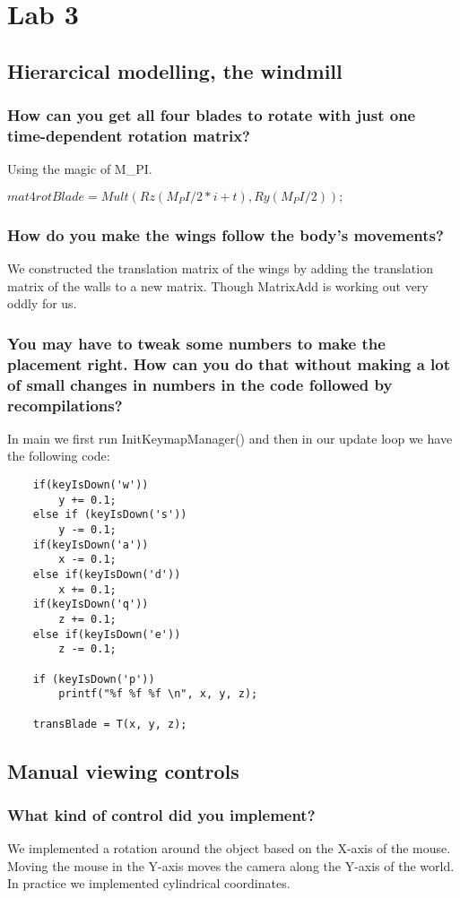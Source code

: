 \documentclass[a4paper,12pt]{article}
\begin{document}
\section{Lab 3}
\subsection{Hierarcical modelling, the windmill}
\subsubsection{How can you get all four blades to rotate with just one time-dependent rotation matrix?}
Using the magic of M\_PI.

$
		mat4 rotBlade = Mult(Rz(M_PI / 2 * i + t), Ry(M_PI / 2));
$

\subsubsection{How do you make the wings follow the body's movements?}
We constructed the translation matrix of the wings by adding the translation matrix of the walls to a new matrix. Though MatrixAdd is working out very oddly for us.

\subsubsection{You may have to tweak some numbers to make the placement right. How can you do that without making a lot of small changes in numbers in the code followed by recompilations?}

In main we first run InitKeymapManager() and then in our update loop we have the following code:

\begin{lstlisting}
	if(keyIsDown('w'))
		y += 0.1;
	else if (keyIsDown('s'))
		y -= 0.1;
	if(keyIsDown('a'))
		x -= 0.1;
	else if(keyIsDown('d'))
		x += 0.1;
	if(keyIsDown('q'))
		z += 0.1;
	else if(keyIsDown('e'))
		z -= 0.1;

	if (keyIsDown('p'))
		printf("%f %f %f \n", x, y, z);

	transBlade = T(x, y, z);
\end{lstlisting}

\subsection{Manual viewing controls}
\subsubsection{What kind of control did you implement?}
We implemented a rotation around the object based on the X-axis of the
mouse. Moving the mouse in the Y-axis moves the camera along the
Y-axis of the world. In practice we implemented cylindrical
coordinates.
\end{document}

